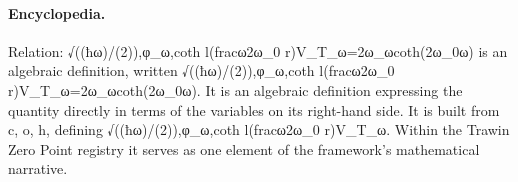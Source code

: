 \paragraph{Encyclopedia.}
Relation: √((ħω)/(2)),φ\_ω,coth l(fracω2ω\_0 r)V\_T\_ω=2ω\_ωcoth(2ω\_0ω) is an algebraic definition, written √((ħω)/(2)),φ\_ω,coth l(fracω2ω\_0 r)V\_T\_ω=2ω\_ωcoth(2ω\_0ω). It is an algebraic definition expressing the quantity directly in terms of the variables on its right-hand side. It is built from c, o, h, defining √((ħω)/(2)),φ\_ω,coth l(fracω2ω\_0 r)V\_T\_ω. Within the Trawin Zero Point registry it serves as one element of the framework's mathematical narrative.
